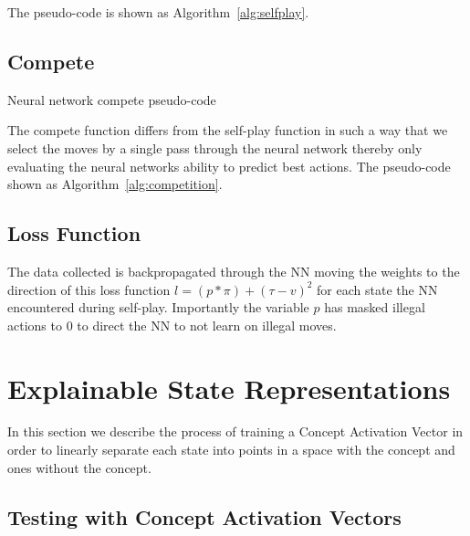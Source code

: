 The pseudo-code is shown as Algorithm~\ref{alg:selfplay}.

\subsection{Compete}

\begin{algorithm}[t]
    \caption{Neural network compete pseudo-code}
    \label{alg:competition}
    \begin{algorithmic}[1]
        \ENDWHILE
        \ENDIF
        \ENDFOR
    \end{algorithmic}
\end{algorithm}

The compete function differs from the self-play function in such a way that we select the moves by a single pass through the neural network thereby only evaluating the neural networks ability to predict best actions. The pseudo-code shown as Algorithm~\ref{alg:competition}.

\subsection{Loss Function}

The data collected is backpropagated through the NN moving the weights to the direction of this loss function $l = (p * \pi) + (\tau - v)^2$ for each state the NN encountered during self-play. Importantly the variable $p$ has masked illegal actions to $0$ to direct the NN to not learn on illegal moves.

\section{Explainable State Representations}

In this section we describe the process of training a Concept Activation Vector in order to linearly separate each state into points in a space with the concept and ones without the concept.

\subsection{Testing with Concept Activation Vectors}

